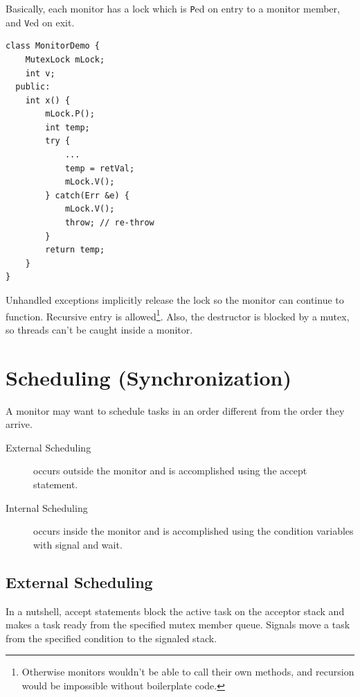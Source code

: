             Basically, each monitor has a lock which is \verb|P|ed on entry to a monitor member, and \verb|V|ed on exit.
            \begin{lstlisting}
class MonitorDemo {
    MutexLock mLock;
    int v;
  public:
    int x() {
        mLock.P();
        int temp;
        try {
            ...
            temp = retVal;
            mLock.V();
        } catch(Err &e) {
            mLock.V();
            throw; // re-throw
        }
        return temp;
    }
}
            \end{lstlisting}
            Unhandled exceptions implicitly release the lock so the monitor can continue to function.
            Recursive entry is allowed\footnote{Otherwise monitors wouldn't be able to call their own methods, and recursion would be impossible without boilerplate code.}.
            Also, the destructor is blocked by a mutex, so threads can't be caught inside a monitor.
        \section{Scheduling (Synchronization)} %
        \label{sec:scheduling_synchronization}
            A monitor may want to schedule tasks in an order different from the order they arrive.
            \begin{description}
                \item[External Scheduling] occurs outside the monitor and is accomplished using the accept statement.
                \item[Internal Scheduling] occurs inside the monitor and is accomplished using the condition variables with signal and wait.
            \end{description}
            \subsection{External Scheduling} %
            \label{sub:external_scheduling}
                In a nutshell, accept statements block the active task on the acceptor stack and makes a task ready from the specified mutex member queue.
                Signals move a task from the specified condition to the signaled stack.

